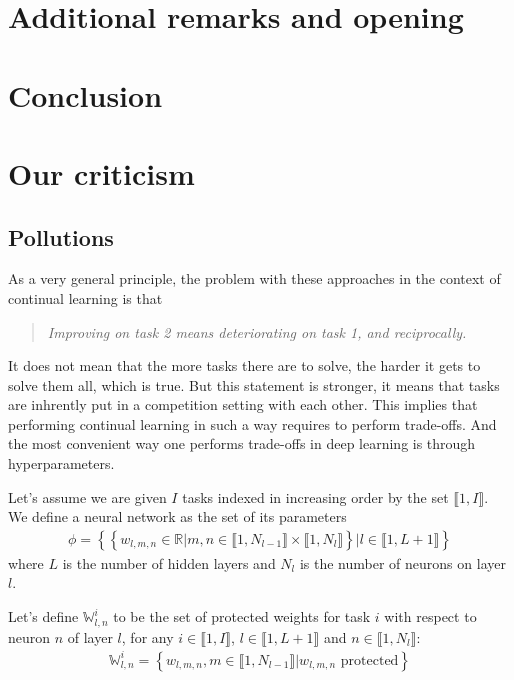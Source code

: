 \documentclass[twocolumn]{article}
\newcommand{\intset}[2]{\llbracket #1, #2 \rrbracket}
\begin{document}
\section{Additional remarks and opening}



\section{Conclusion}



\section{Our criticism}



\subsection{Pollutions}


\noindent
As a very general principle, the problem with these approaches in the context of continual learning is that
\begin{quote}
    \itshape
    \centering
    Improving on task 2 means deteriorating on task 1, and reciprocally.
\end{quote}

\noindent
It does not mean that the more tasks there are to solve, the harder it gets to solve them all, which is true. But this statement is stronger, it means that tasks are inhrently put in a competition setting with each other. This implies that performing continual learning in such a way requires to perform trade-offs. And the most convenient way one performs trade-offs in deep learning is through hyperparameters.

\vspace{1mm}
\noindent
Let's assume we are given $I$ tasks indexed in increasing order by the set $\intset{1}{I}$. We define a neural network as the set of its parameters
\begin{align}
    \phi = \left\{\left\{ w_{l,m,n} \in \mathbb{R} | m,n \in \llbracket 1, N_{l-1} \rrbracket \times \llbracket 1, N_{l} \rrbracket \right\} | l \in \llbracket 1, L+1 \rrbracket \right\}
\end{align}
where $L$ is the number of hidden layers and $N_l$ is the number of neurons on layer $l$.

\vspace{1mm}
\noindent
Let's define $\mathbb{W}_{l,n}^i$ to be the set of protected weights for task $i$ with respect to neuron $n$ of layer $l$, for any $i \in \intset{1}{I}$, $l \in \intset{1}{L+1}$ and $n \in \intset{1}{N_l}$:
\begin{align}
    \mathbb{W}_{l,n}^i = \left\{ w_{l,m,n}, m \in \intset{1}{N_{l-1}} | w_{l,m,n} \text{ protected} \right\}
\end{align}
\end{document}
